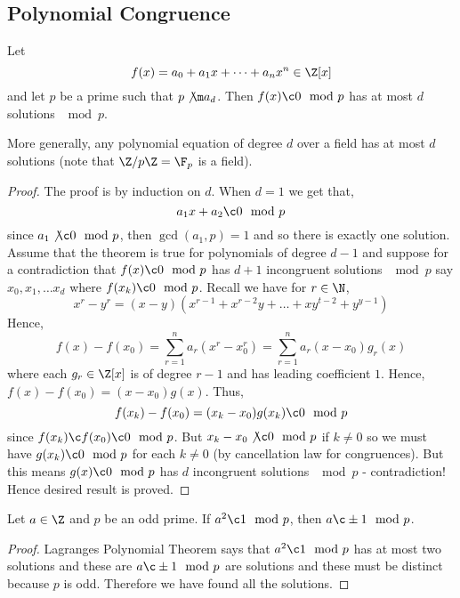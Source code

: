 \subsection{Polynomial Congruence}
\begin{nthm}
  Let
  $$ f(x) = a_0 + a_1x + \dots + a_nx^n \in \Z[x] $$
  and let $p$ be a prime such that $p\not\m a_d$. Then $f(x) \c 0\mod p$ has at most $d$ solutions $\mod p$.
\end{nthm}

\begin{remark}
   More generally, any polynomial equation of degree $d$ over a field has at most $d$ solutions (note that $\Z/p\Z = \F_p$ is a field).
\end{remark}

\begin{proof}
  The proof is by induction on $d$. When $d = 1$ we get that,
  $$ a_1x + a_2 \c 0 \mod p $$
  since $a_1 \not\c 0\mod p$, then $\gcd(a_1, p)= 1$ and so there is exactly one solution.\\

  Assume that the theorem is true for polynomials of degree $d - 1$ and suppose for a contradiction that $f(x) \c 0 \mod p$ has $d + 1$ incongruent solutions $\mod p$ say $x_0, x_1, \dots x_d$ where $f(x_k) \c 0 \mod p$. Recall we have for $r \in \N$,
  $$ x^r - y^r = (x - y)(x^{r-1} + x^{r-2}y + \dots + xy^{t-2} + y^{y-1}) $$
  Hence,
  $$ f(x) - f(x_0) = \sum_{r=1}^n a_r(x^r - x_0^r) = \sum_{r=1}^n a_r(x - x_0)g_r(x) $$
  where each $g_r \in \Z[x]$ is of degree $r - 1$ and has leading coefficient $1$. Hence, $f(x) - f(x_0) = (x- x_0)g(x)$. Thus,
  $$ f(x_k) - f(x_0) = (x_k - x_0)g(x_k) \c 0\mod p $$
  since $f(x_k) \c f(x_0) \c 0\mod p$. But $x_k - x_0 \not\c 0 \mod p$ if $k \ne 0$ so we must have $g(x_k) \c 0 \mod p$ for each $k \ne 0$ (by cancellation law for congruences). But this means $g(x) \c 0 \mod p$ has $d$ incongruent solutions $\mod p$ - contradiction! Hence desired result is proved.
\end{proof}

\begin{ncor}
   Let $a \in \Z$ and $p$ be an odd prime. If $a^2 \c 1 \mod p$, then $a \c \pm 1 \mod p$.
\end{ncor}
\begin{proof}
  Lagranges Polynomial Theorem says that $a^2 \c 1 \mod p$ has at most two solutions and these are $a\c \pm 1\mod p$ are solutions and these must be distinct because $p$ is odd. Therefore we have found all the solutions.
\end{proof}

